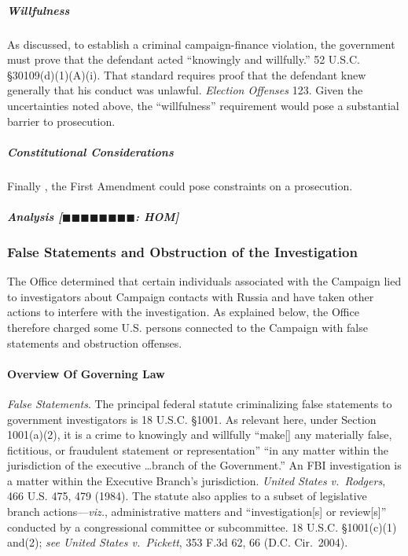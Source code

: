 \subparagraph{Willfulness}
As discussed, to establish a criminal campaign-finance violation, the government must prove that the defendant acted ``knowingly and willfully.''
52 U.S.C. \S 30109(d)(1)(A)(i).
That standard requires proof that the defendant knew generally that his conduct was unlawful.
\textit{Election Offenses} 123.
Given the uncertainties noted above, the ``willfulness'' requirement would pose a substantial barrier to prosecution.

\subparagraph{Constitutional Considerations}
Finally , the First Amendment could pose constraints on a prosecution.

\subparagraph{Analysis [$\blacksquare\blacksquare\blacksquare\blacksquare\blacksquare\blacksquare\blacksquare\blacksquare$: HOM]}



\subsubsection{False Statements and Obstruction of the Investigation}
The Office determined that certain individuals associated with the Campaign lied to investigators about Campaign contacts with Russia and have taken other actions to interfere with the investigation.
As explained below, the Office therefore charged some U.S. persons connected to the Campaign with false statements and obstruction offenses.

\paragraph{Overview Of Governing Law}
\textit{False Statements}.
The principal federal statute criminalizing false statements to government investigators is 18 U.S.C. \S 1001.
As relevant here, under Section 1001(a)(2), it is a crime to knowingly and willfully ``make[] any materially false, fictitious, or fraudulent statement or representation'' ``in any matter within the jurisdiction of the executive \dots branch of the Government.''
An FBI investigation is a matter within the Executive Branch's jurisdiction.
\textit{United States v.\ Rodgers}, 466 U.S. 475, 479 (1984).
The statute also applies to a subset of legislative branch actions---\textit{viz.}, administrative matters and ``investigation[s] or review[s]'' conducted by a congressional committee or subcommittee.
18 U.S.C. \S 1001(c)(1) and(2); \textit{see United States v.\ Pickett}, 353 F.3d 62, 66 (D.C. Cir.~2004).

